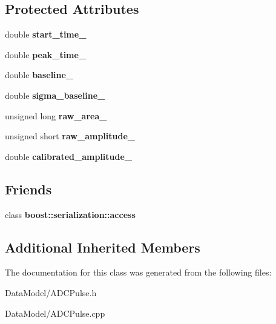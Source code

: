 \subsection*{Protected Attributes}
\begin{DoxyCompactItemize}
\item 
\hypertarget{classADCPulse_af93ef20fa02d9ea44a7b84d32c8b029f}{double {\bfseries start\-\_\-time\-\_\-}}\label{classADCPulse_af93ef20fa02d9ea44a7b84d32c8b029f}

\item 
\hypertarget{classADCPulse_a4e87f35bcc0f597f6e3c3e73d0b4312b}{double {\bfseries peak\-\_\-time\-\_\-}}\label{classADCPulse_a4e87f35bcc0f597f6e3c3e73d0b4312b}

\item 
\hypertarget{classADCPulse_ab355ff3d438597f659f899e14e9ce37a}{double {\bfseries baseline\-\_\-}}\label{classADCPulse_ab355ff3d438597f659f899e14e9ce37a}

\item 
\hypertarget{classADCPulse_a97eddbc21ba72324520405c64288693e}{double {\bfseries sigma\-\_\-baseline\-\_\-}}\label{classADCPulse_a97eddbc21ba72324520405c64288693e}

\item 
\hypertarget{classADCPulse_ae665395493e477287e366b9d8772996d}{unsigned long {\bfseries raw\-\_\-area\-\_\-}}\label{classADCPulse_ae665395493e477287e366b9d8772996d}

\item 
\hypertarget{classADCPulse_ad77ade03d815b418fe138fd599f3db57}{unsigned short {\bfseries raw\-\_\-amplitude\-\_\-}}\label{classADCPulse_ad77ade03d815b418fe138fd599f3db57}

\item 
\hypertarget{classADCPulse_ae68ae047968f1257b4aa0ad9bfd08847}{double {\bfseries calibrated\-\_\-amplitude\-\_\-}}\label{classADCPulse_ae68ae047968f1257b4aa0ad9bfd08847}

\end{DoxyCompactItemize}
\subsection*{Friends}
\begin{DoxyCompactItemize}
\item 
\hypertarget{classADCPulse_ac98d07dd8f7b70e16ccb9a01abf56b9c}{class {\bfseries boost\-::serialization\-::access}}\label{classADCPulse_ac98d07dd8f7b70e16ccb9a01abf56b9c}

\end{DoxyCompactItemize}
\subsection*{Additional Inherited Members}


The documentation for this class was generated from the following files\-:\begin{DoxyCompactItemize}
\item 
Data\-Model/A\-D\-C\-Pulse.\-h\item 
Data\-Model/A\-D\-C\-Pulse.\-cpp\end{DoxyCompactItemize}
